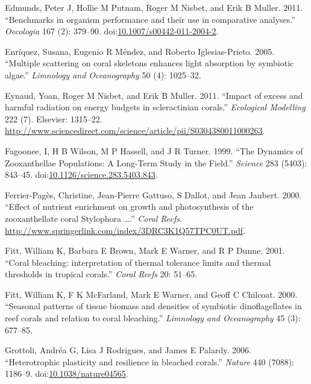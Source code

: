\documentclass[]{elsarticle} %
\begin{document}
\hypertarget{ref-Edmunds:2011bv}{}
Edmunds, Peter J, Hollie M Putnam, Roger M Nisbet, and Erik B Muller.
2011. ``Benchmarks in organism performance and their use in comparative
analyses.'' \emph{Oecologia} 167 (2): 379--90.
doi:\href{https://doi.org/10.1007/s00442-011-2004-2}{10.1007/s00442-011-2004-2}.

\hypertarget{ref-Enriquez:2005p142}{}
Enríquez, Susana, Eugenio R Méndez, and Roberto Iglesias-Prieto. 2005.
``Multiple scattering on coral skeletons enhances light absorption by
symbiotic algae.'' \emph{Limnology and Oceanography} 50 (4): 1025--32.

\hypertarget{ref-Eynaud:2011tv}{}
Eynaud, Yoan, Roger M Nisbet, and Erik B Muller. 2011. ``Impact of
excess and harmful radiation on energy budgets in scleractinian
corals.'' \emph{Ecological Modelling} 222 (7). Elsevier: 1315--22.
\url{http://www.sciencedirect.com/science/article/pii/S0304380011000263}.

\hypertarget{ref-Fagoonee:1999p4136}{}
Fagoonee, I, H B Wilson, M P Hassell, and J R Turner. 1999. ``The
Dynamics of Zooxanthellae Populations: A Long-Term Study in the Field.''
\emph{Science} 283 (5403): 843--45.
doi:\href{https://doi.org/10.1126/science.283.5403.843}{10.1126/science.283.5403.843}.

\hypertarget{ref-FerrierPages:2000p1950}{}
Ferrier-Pagès, Christine, Jean-Pierre Gattuso, S Dallot, and Jean
Jaubert. 2000. ``Effect of nutrient enrichment on growth and
photosynthesis of the zooxanthellate coral Stylophora \ldots{}.''
\emph{Coral Reefs}.
\url{http://www.springerlink.com/index/3DRC3K1Q57TPC0UT.pdf}.

\hypertarget{ref-Fitt:2001p832}{}
Fitt, William K, Barbara E Brown, Mark E Warner, and R P Dunne. 2001.
``Coral bleaching: interpretation of thermal tolerance limits and
thermal thresholds in tropical corals.'' \emph{Coral Reefs} 20: 51--65.

\hypertarget{ref-Fitt:2000p3792}{}
Fitt, William K, F K McFarland, Mark E Warner, and Geoff C Chilcoat.
2000. ``Seasonal patterns of tissue biomass and densities of symbiotic
dinoflagellates in reef corals and relation to coral bleaching.''
\emph{Limnology and Oceanography} 45 (3): 677--85.

\hypertarget{ref-Grottoli:2006p3692}{}
Grottoli, Andréa G, Lisa J Rodrigues, and James E Palardy. 2006.
``Heterotrophic plasticity and resilience in bleached corals.''
\emph{Nature} 440 (7088): 1186--9.
doi:\href{https://doi.org/10.1038/nature04565}{10.1038/nature04565}.
\end{document}

